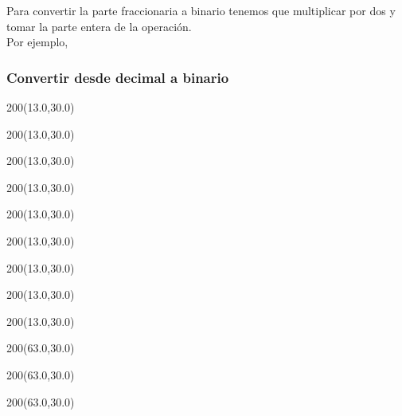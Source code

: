 \documentclass[aspectratio=169]{beamer}
\begin{document}
\begin{frame}[fragile,t]
    Para convertir la parte fraccionaria a binario tenemos que multiplicar por dos y tomar la parte entera de la operación.\\
    Por ejemplo,
    \frametitle{Convertir desde decimal a binario}
    \begin{textblock}{200}(13.0,30.0)   \end{textblock} %
    \begin{textblock}{200}(13.0,30.0)   \end{textblock}
    \begin{textblock}{200}(13.0,30.0)   \end{textblock}
    \begin{textblock}{200}(13.0,30.0)   \end{textblock}
    \begin{textblock}{200}(13.0,30.0)   \end{textblock}
    \begin{textblock}{200}(13.0,30.0)   \end{textblock}
    \begin{textblock}{200}(13.0,30.0)   \end{textblock}
    \begin{textblock}{200}(13.0,30.0)   \end{textblock}
    \begin{textblock}{200}(13.0,30.0)   \end{textblock}
    \begin{textblock}{200}(63.0,30.0)   \end{textblock} %
    \begin{textblock}{200}(63.0,30.0)   \end{textblock}
    \begin{textblock}{200}(63.0,30.0)   \end{textblock}

\end{frame}
\end{document}

